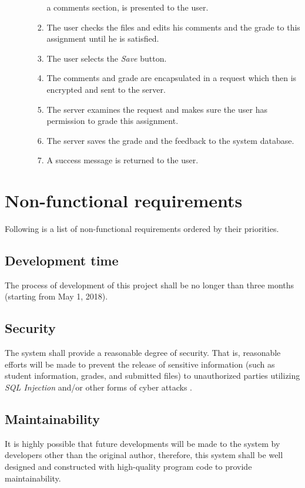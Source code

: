\begin{enumerate}
\begin{itemize}
\begin{enumerate}
                a comments section, is presented to the user.
            \item The user checks the files and edits his comments and the
                grade to this assignment until he is satisfied.
            \item The user selects the \emph{Save} button.
            \item The comments and grade are encapsulated in a request which
                then is encrypted and sent to the server.
            \item The server examines the request and makes sure the user has
                permission to grade this assignment.
            \item The server saves the grade and the feedback to the system
                database.
            \item A success message is returned to the user.
        \end{enumerate}
\end{itemize}
\end{enumerate}

\pagebreak

\section{Non-functional requirements}
Following is a list of non-functional requirements ordered by their priorities.

\subsection{Development time}
\label{TIMEFRAME}
The process of development of this project shall be no longer than three
months (starting from May 1, 2018).

\subsection{Security}
\label{SECURITY}
The system shall provide a reasonable degree of security.
That is, reasonable efforts will be made to prevent the release of 
sensitive information (such as student information, grades, and
submitted files) to unauthorized parties utilizing \emph{SQL Injection} 
and/or other forms of cyber attacks \cite{cyberAttacks}.

\subsection{Maintainability}
\label{MAINTAINABILITY}
It is highly possible that future developments will be made to the system by
developers other than the original author, therefore, this system shall be
well designed and constructed with high-quality program code to provide
maintainability.

